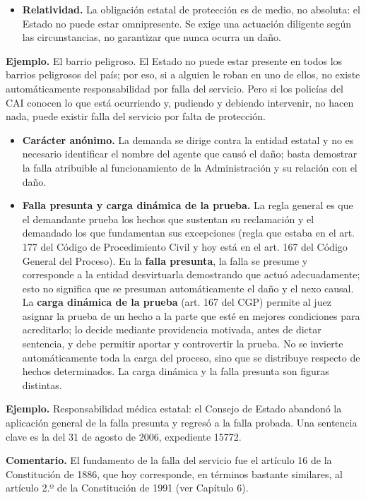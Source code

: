 \begin{itemize}
\item \textbf{Relatividad.} La obligación estatal de protección es de medio, no absoluta: el Estado no puede estar omnipresente. Se exige una actuación diligente según las circunstancias, no garantizar que nunca ocurra un daño.
\end{itemize}
\begin{ejemplo}
\textcolor[HTML]{4F6228}{\textbf{Ejemplo. }}El barrio peligroso. El Estado no puede estar presente en todos los barrios peligrosos del país; por eso, si a alguien le roban en uno de ellos, no existe automáticamente responsabilidad por falla del servicio. Pero si los policías del CAI conocen lo que está ocurriendo y, pudiendo y debiendo intervenir, no hacen nada, puede existir falla del servicio por falta de protección.
\end{ejemplo}
\begin{itemize}
\item \textbf{Carácter anónimo.} La demanda se dirige contra la entidad estatal y no es necesario identificar el nombre del agente que causó el daño; basta demostrar la falla atribuible al funcionamiento de la Administración y su relación con el daño.
\item \textbf{Falla presunta y carga dinámica de la prueba.} La regla general es que el demandante prueba los hechos que sustentan su reclamación y el demandado los que fundamentan sus excepciones (regla que estaba en el art. 177 del Código de Procedimiento Civil y hoy está en el art. 167 del Código General del Proceso). En la \textbf{falla presunta}, la falla se presume y corresponde a la entidad desvirtuarla demostrando que actuó adecuadamente; esto no significa que se presuman automáticamente el daño y el nexo causal. La \textbf{carga dinámica de la prueba} (art. 167 del CGP) permite al juez asignar la prueba de un hecho a la parte que esté en mejores condiciones para acreditarlo; lo decide mediante providencia motivada, antes de dictar sentencia, y debe permitir aportar y controvertir la prueba. No se invierte automáticamente toda la carga del proceso, sino que se distribuye respecto de hechos determinados. La carga dinámica y la falla presunta son figuras distintas.
\end{itemize}
\begin{ejemplo}
\textcolor[HTML]{4F6228}{\textbf{Ejemplo. }}Responsabilidad médica estatal: el Consejo de Estado abandonó la aplicación general de la falla presunta y regresó a la falla probada. Una sentencia clave es la del 31 de agosto de 2006, expediente 15772.
\end{ejemplo}
\begin{comentario}
\textcolor[HTML]{8A6D3B}{\textbf{Comentario. }}El fundamento de la falla del servicio fue el artículo 16 de la Constitución de 1886, que hoy corresponde, en términos bastante similares, al artículo 2.º de la Constitución de 1991 (ver Capítulo 6).
\end{comentario}
